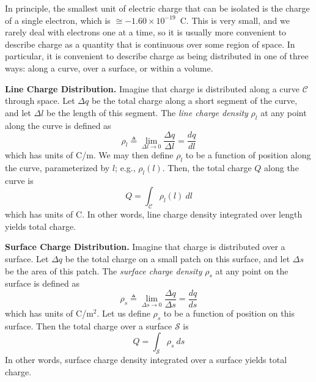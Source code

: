 

\label{m0100_Charge_Distributions} %

In principle, the smallest unit of electric charge that can be isolated is the charge of a single electron, which is $\cong -1.60 \times 10^{-19}$~C.
This is very small, and we rarely deal with electrons one at a time, so it is usually more convenient to describe charge as a quantity that is continuous over some region of space.  In particular, it is convenient to describe charge as being distributed in one of three ways: along a curve, over a surface, or within a volume.

{\bf Line Charge Distribution.} 
Imagine that charge is distributed along a curve ${\mathcal C}$ through space.   
Let $\Delta q$ be the total charge along a short segment of the curve, and let $\Delta l$ be the length of this segment.
The \emph{line charge density} $\rho_l$ at any point along the curve is defined as
%
\begin{equation}
\rho_l \triangleq \lim_{\Delta l \to 0} \frac{\Delta q}{\Delta l} = \frac{dq}{dl}
\end{equation}
%
which has units of C/m.
We may then define $\rho_l$ to be a function of position along the curve, parameterized by $l$; e.g., $\rho_l(l)$.
Then, the total charge $Q$ along the curve is
%
\begin{equation}
Q = \int_{\mathcal C} \rho_l(l)~dl
\end{equation}
%
which has units of C.
In other words, line charge density integrated over length yields total charge.

{\bf Surface Charge Distribution.} 
Imagine that charge is distributed over a surface.   
Let $\Delta q$ be the total charge on a small patch on this surface, and let $\Delta s$ be the area of this patch.
The \emph{surface charge density} $\rho_s$ at any point on the surface is defined as
%
\begin{equation}
\rho_s \triangleq \lim_{\Delta s \to 0} \frac{\Delta q}{\Delta s} = \frac{dq}{ds}
\end{equation}
%
which has units of C/m$^2$.
Let us define $\rho_s$ to be a function of position on this surface.
Then the total charge over a surface ${\mathcal S}$ is
%
\begin{equation}
Q = \int_{\mathcal S} \rho_s~ds
\end{equation}
%
In other words, surface charge density integrated over a surface yields total charge.

